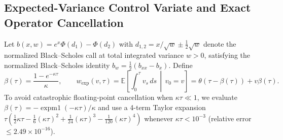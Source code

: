 \documentclass[11pt,a4paper]{article}
\begin{document}
\subsection{Expected-Variance Control Variate and Exact Operator Cancellation}

Let $b(x, w) = e^x \Phi(d_1) - \Phi(d_2)$ with $d_{1,2} = x/\sqrt{w} \pm \frac{1}{2}\sqrt{w}$ denote the normalized Black--Scholes call at total integrated variance $w > 0$, satisfying the normalized Black--Scholes identity $b_w = \frac{1}{2}(b_{xx} - b_x)$. Define
\begin{equation}
  \beta(\tau) = \frac{1 - e^{-\kappa\tau}}{\kappa}, \qquad w_{\mathrm{exp}}(v, \tau) = \mathbb{E}\!\left[\int_0^\tau v_s\,ds \,\middle|\, v_0 = v\right] = \theta(\tau - \beta(\tau)) + v\beta(\tau).
  \label{eq:w_exp}
\end{equation}
To avoid catastrophic floating-point cancellation when $\kappa\tau \ll 1$, we evaluate $\beta(\tau) = -\operatorname{expm1}(-\kappa\tau)/\kappa$ and use a 4-term Taylor expansion $\tau(\frac{1}{2}\kappa\tau - \frac{1}{6}(\kappa\tau)^2 + \frac{1}{24}(\kappa\tau)^3 - \frac{1}{120}(\kappa\tau)^4)$ whenever $\kappa\tau < 10^{-3}$ (relative error $\le 2.49 \times 10^{-16}$).
\end{document}
